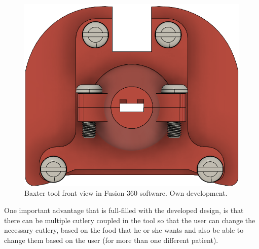 \documentclass[11pt]{report} %
\begin{document}
\begin{figure}[H]
    \centering
    \includegraphics[width=0.6\linewidth]{assets/imgs/baxter_robot/baxter_spoon_fusion_front_view.png}
    \caption{Baxter tool front view in Fusion 360 software. Own development.} 
    \label{fig_baxter_tool_fusion_front_view}
\end{figure}


One important advantage that is full-filled with the developed design, is that there can be multiple cutlery coupled in the tool so that the user can change the necessary cutlery, based on the food that he or she wants and also be able to change them based on the user (for more than one different patient).\\
\end{document}
